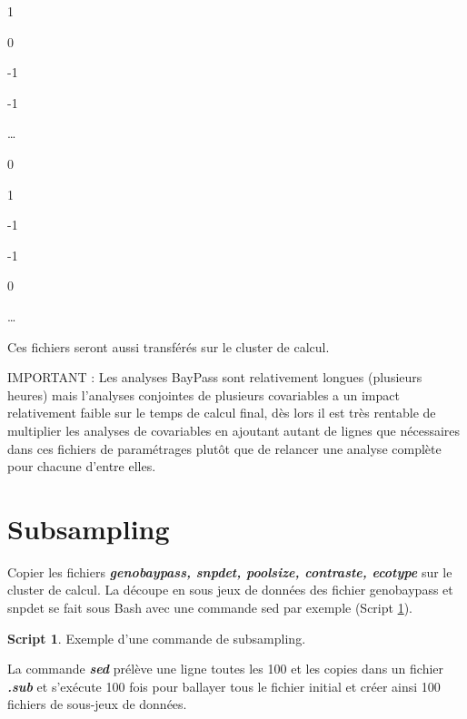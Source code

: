 \documentclass[
  openany]{book}
\newenvironment{Shaded}{\begin{snugshade}}{\end{snugshade}}
\newcommand{\AttributeTok}[1]{\textcolor[rgb]{0.13,0.29,0.53}{#1}}
\newcommand{\ControlFlowTok}[1]{\textcolor[rgb]{0.13,0.29,0.53}{\textbf{#1}}}
\newcommand{\DataTypeTok}[1]{\textcolor[rgb]{0.13,0.29,0.53}{#1}}
\newcommand{\DecValTok}[1]{\textcolor[rgb]{0.00,0.00,0.81}{#1}}
\newcommand{\FunctionTok}[1]{\textcolor[rgb]{0.13,0.29,0.53}{\textbf{#1}}}
\newcommand{\KeywordTok}[1]{\textcolor[rgb]{0.13,0.29,0.53}{\textbf{#1}}}
\newcommand{\NormalTok}[1]{#1}
\newcommand{\OperatorTok}[1]{\textcolor[rgb]{0.81,0.36,0.00}{\textbf{#1}}}
\newcommand{\StringTok}[1]{\textcolor[rgb]{0.31,0.60,0.02}{#1}}
\newcommand{\VariableTok}[1]{\textcolor[rgb]{0.00,0.00,0.00}{#1}}
\theoremstyle{definition}
\theoremstyle{definition}
\newtheorem{example}{Script}[chapter]
\theoremstyle{definition}
\theoremstyle{definition}
\theoremstyle{remark}
\begin{document}
1

0

-1

-1

\ldots{}

0

1

-1

-1

0

\ldots{}

Ces fichiers seront aussi transférés sur le cluster de calcul.

IMPORTANT : Les analyses BayPass sont relativement longues (plusieurs heures) mais l'analyses conjointes de plusieurs covariables a un impact relativement faible sur le temps de calcul final, dès lors il est très rentable de multiplier les analyses de covariables en ajoutant autant de lignes que nécessaires dans ces fichiers de paramétrages plutôt que de relancer une analyse complète pour chacune d'entre elles.

\hypertarget{subsampling}{%
\section*{Subsampling}\label{subsampling}}

Copier les fichiers \textbf{\emph{genobaypass, snpdet, poolsize, contraste, ecotype}} sur le cluster de calcul.
La découpe en sous jeux de données des fichier genobaypass et snpdet se fait sous Bash avec une commande sed par exemple (Script \ref{exm:script3}).

\begin{example}
\protect\hypertarget{exm:script3}{}\label{exm:script3}{Exemple d'une commande de subsampling.}
\end{example}

La commande \textbf{\emph{sed}} prélève une ligne toutes les 100 et les copies dans un fichier \textbf{\emph{.sub}} et s'exécute 100 fois pour ballayer tous le fichier initial et créer ainsi 100 fichiers de sous-jeux de données.

\begin{Shaded}
\end{Shaded}
\end{document}
